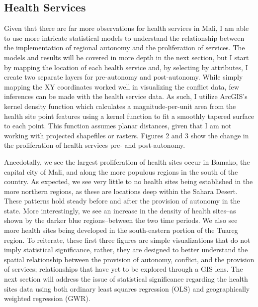\documentclass[12pt]{elsarticle}
\begin{document}
\subsection{Health Services}
Given that there are far more observations for health services in Mali, I am able to use more intricate statistical models to understand the relationship between the implementation of regional autonomy and the proliferation of services. The models and results will be covered in more depth in the next section, but I start by mapping the location of each health service and, by selecting by attributes, I create two separate layers for pre-autonomy and post-autonomy. While simply mapping the XY coordinates worked well in visualizing the conflict data, few inferences can be made with the health service data. As such, I utilize ArcGIS's kernel density function which calculates a magnitude-per-unit area from the health site point features using a kernel function to fit a smoothly tapered surface to each point. This function assumes planar distances, given that I am not working with projected shapefiles or rasters. Figures 2 and 3 show the change in the proliferation of health services pre- and post-autonomy.

Anecdotally, we see the largest proliferation of health sites occur in Bamako, the capital city of Mali, and along the more populous regions in the south of the country. As expected, we see very little to no health sites being established in the more northern regions, as these are locations deep within the Sahara Desert. These patterns hold steady before and after the provision of autonomy in the state. More interestingly, we see an increase in the density of health sites--as shown by the darker blue regions--between the two time periods. We also see more health sites being developed in the south-eastern portion of the Tuareg region. To reiterate, these first three figures are simple visualizations that do not imply statistical significance, rather, they are designed to better understand the spatial relationship between the provision of autonomy, conflict, and the provision of services; relationships that have yet to be explored through a GIS lens. The next section will address the issue of statistical significance regarding the health sites data using both ordinary least squares regression (OLS) and geographically weighted regression (GWR).
\end{document}
